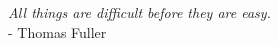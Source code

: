 \vspace*{3cm}

\begin{flushright}
	\emph{All things are difficult before they are easy.} \\
	\medskip - Thomas Fuller
\end{flushright}

\begin{center}
\end{center}
